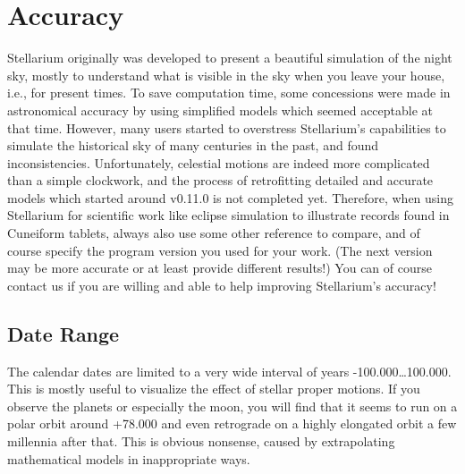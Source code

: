 


\chapter{Accuracy}
\label{ch:Accuracy}

Stellarium originally was developed to present a beautiful simulation
of the night sky, mostly to understand what is visible in the sky when
you leave your house, i.e., for present times. To save computation
time, some concessions were made in astronomical accuracy by using
simplified models which seemed acceptable at that time. However, many
users started to overstress Stellarium's capabilities to simulate the
historical sky of many centuries in the past, and found
inconsistencies.  Unfortunately, celestial motions are indeed more
complicated than a simple clockwork, and the process of retrofitting
detailed and accurate models which started around v0.11.0 is not
completed yet. Therefore, when using Stellarium for scientific work
like eclipse simulation to illustrate records found in Cuneiform
tablets, always also use some other reference to compare, and of 
course specify the program version you used for your work. (The next version 
may be more accurate or at least provide different results!) You can of
course contact us if you are willing and able to help improving
Stellarium's accuracy!

\section{Date Range}
\label{sec:Accuracy:DateRange}

The calendar dates are limited to a very wide interval of years -100.000\ldots100.000. 
This is mostly useful to visualize the effect of stellar proper motions. 
If you observe the planets or especially the moon, you will find that it seems to run 
on a polar orbit around +78.000 and even retrograde on a highly elongated orbit a few millennia after that. 
This is obvious nonsense, caused by extrapolating mathematical models in inappropriate ways. 

